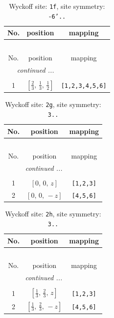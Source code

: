 \documentclass[fleqn,8pt]{jsarticle}
\begin{document}
\renewcommand{\arraystretch}{1.2}
\begin{longtable}{ccc}
\caption{Wyckoff site: {\tt 1f}, site symmetry: {\tt -6'..}}
 \\
 \hline \hline
No. & position & mapping \\ \hline \endfirsthead

\multicolumn{2}{l}{\tablename\ \thetable{}} \\
 \hline \hline
No. & position & mapping \\ \hline \endhead

 \hline \hline
\multicolumn{2}{r}{\footnotesize\it continued ...} \\ \endfoot

 \hline \hline
\multicolumn{2}{r}{} \\ \endlastfoot

1 & $\left[ \frac{2}{3},\, \frac{1}{3},\, \frac{1}{2} \right]$ & {\tt [1,2,3,4,5,6]} \\
\end{longtable}
\renewcommand{\arraystretch}{1.2}
\begin{longtable}{ccc}
\caption{Wyckoff site: {\tt 2g}, site symmetry: {\tt 3..}}
 \\
 \hline \hline
No. & position & mapping \\ \hline \endfirsthead

\multicolumn{2}{l}{\tablename\ \thetable{}} \\
 \hline \hline
No. & position & mapping \\ \hline \endhead

 \hline \hline
\multicolumn{2}{r}{\footnotesize\it continued ...} \\ \endfoot

 \hline \hline
\multicolumn{2}{r}{} \\ \endlastfoot

1 & $\left[ 0,\, 0,\, z \right]$ & {\tt [1,2,3]} \\ \hline
2 & $\left[ 0,\, 0,\, - z \right]$ & {\tt [4,5,6]} \\
\end{longtable}
\renewcommand{\arraystretch}{1.2}
\begin{longtable}{ccc}
\caption{Wyckoff site: {\tt 2h}, site symmetry: {\tt 3..}}
 \\
 \hline \hline
No. & position & mapping \\ \hline \endfirsthead

\multicolumn{2}{l}{\tablename\ \thetable{}} \\
 \hline \hline
No. & position & mapping \\ \hline \endhead

 \hline \hline
\multicolumn{2}{r}{\footnotesize\it continued ...} \\ \endfoot

 \hline \hline
\multicolumn{2}{r}{} \\ \endlastfoot

1 & $\left[ \frac{1}{3},\, \frac{2}{3},\, z \right]$ & {\tt [1,2,3]} \\ \hline
2 & $\left[ \frac{1}{3},\, \frac{2}{3},\, - z \right]$ & {\tt [4,5,6]} \\
\end{longtable}
\end{document}
